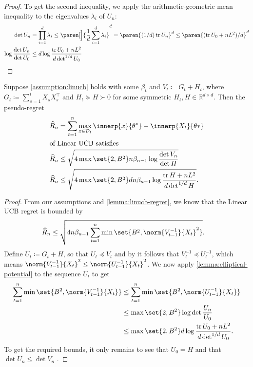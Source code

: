 \documentclass{article}
\newcommand{\defeq}{\coloneq}
\newcommand{\inv}[1]{#1^{-1}}
\newcommand{\Real}{\mathds{R}}
\DeclareMathOperator{\tr}{tr}
\DeclarePairedDelimiter{\paren}()
\newcommand{\transp}[1]{#1^\top}
\newcommand{\Dset}[1]{\mathcal{D}_{#1}}
\begin{document}
\begin{lemma}
\begin{proof}
    To get the second inequality, we apply the arithmetic-geometric
    mean inequality to the eigenvalues $\lambda_i$ of $U_n$:
    \begin{align*}
      \det U_n &= \prod_{i=1}^d \lambda_i
                \le \paren[\Big]{\frac{1}{d} \sum_{i=1}^d \lambda_i}^d
                = \paren{(1/d)\tr U_n}^d
                \le \paren{(\tr U_0 + nL^2)/d}^d \\
      \log\frac{\det U_n}{\det U_0}
              &\le d\log\frac{\tr U_0 + nL^2}{d\det^{1/d}U_0}
                \qedhere
    \end{align*}
  \end{proof}
\end{lemma}


\begin{theorem}\label{thm:linucb-regret}
  Suppose \cref{assumption:linucb} holds with some $\beta_t$ and
  $V_t \defeq G_t + H_t$, where
  $G_t \defeq \sum_{s=1}^t X_s\transp{X_s}$ and
  $H_t \succeq H \succ 0$ for some symmetric
  $H_t, H \in \Real^{d\times d}$.  Then the pseudo-regret
  \begin{align*}
    \widehat{R}_n &= \sum_{t=1}^n \max_{x\in\Dset{t}} \innerp{x}{\theta^*} - \innerp{X_t}{\theta*} \\
    \intertext{of Linear UCB satisfies}
    \widehat{R}_n &\le \sqrt{4\max\set{2,B^2}n\beta_{n-1} \log\frac{\det V_n}{\det H}} \\
    \widehat{R}_n &\le \sqrt{4\max\set{2,B^2}dn\beta_{n-1}\log\frac{\tr H + nL^2}{d\det^{1/d} H}}.
  \end{align*}

  \begin{proof}
    From our assumptions and \cref{lemma:linucb-regret}, we know that
    the Linear UCB regret is bounded by
    \begin{align*}
      \widehat{R}_n &\le \sqrt{4n\beta_{n-1} \sum_{t=1}^n\min\set{B^2, \norm{\inv{V_{t-1}}}{X_t}^2}}.
    \end{align*}
    Define $U_t \defeq G_t + H$, so that $U_t \preceq V_t$ and by
    \citet[Theorem~7.8]{ZhangMatrixTheory2011} it follows that
    $\inv{V_t} \preceq \inv{U_t}$, which means $\norm{\inv{V_{t-1}}}{X_t}^2
    \le \norm{\inv{U_{t-1}}}{X_t}^2$.  We now apply
    \cref{lemma:elliptical-potential} to the sequence $U_t$ to get
    \begin{align*}
      \sum_{t=1}^n\min\set{B^2,\norm{\inv{V_{t-1}}}{X_t}}
      &\le \sum_{t=1}^n\min\set{B^2,\norm{\inv{U_{t-1}}}{X_t}} \\
      &\le \max\set{2, B^2}\log\det\frac{U_n}{U_0} \\
      &\le \max\set{2, B^2}d\log\frac{\tr U_0 + nL^2}{d \det^{1/d} U_0}.
    \end{align*}
    To get the required bounds, it only remains to see that $U_0 = H$
    and that $\det U_n \le \det V_n$ \citep[again
    by][Theorem~7.8]{ZhangMatrixTheory2011}.
  \end{proof}

\end{theorem}
\end{document}
